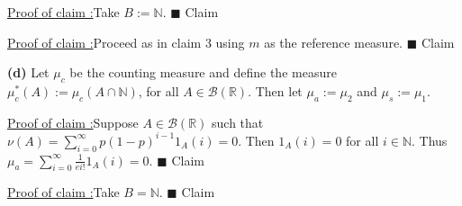 \documentclass[12pt]{article}
\newcounter{ProofCounter}
\newcounter{ClaimCounter}[ProofCounter]
\newenvironment{claim}[1]{\stepcounter{ClaimCounter}\par\noindent\underline{Claim \theClaimCounter:}\space#1}{}
\newenvironment{claimproof}[1]{\par\noindent\underline{Proof of claim \theClaimCounter:}\space#1}{\hfill $\blacksquare$ Claim \theClaimCounter\vspace{5mm}}
\begin{document}
\begin{claimproof}
Take $B := \mathbb{N}$.
\end{claimproof}

\begin{claimproof}
Proceed as in claim 3 using $m$ as the reference measure.
\end{claimproof}



{\bf (d)}
Let $\mu_{c}$ be the counting measure and define the measure $\mu_{c}^*(A) := \mu_{c}(A\cap\mathbb{N})$, for all $A \in \mathcal{B}(\mathbb{R})$. 
Then let $\mu_{a} := \mu_{2}$ and $\mu_{s} := \mu_{1}$.

\begin{claimproof}
Suppose $A \in \mathcal{B}(\mathbb{R})$ such that $\nu(A) = \sum_{i=0}^{\infty}p(1-p)^{i-1}1_{A}(i) = 0$. Then $1_{A}(i) = 0$ for all $i \in
\mathbb{N}$. Thus $\mu_{a} = \sum_{i=0}^{\infty}\frac{1}{ei!}1_{A}(i) = 0$.
\end{claimproof}

\begin{claimproof}
Take $B = \mathbb{N}$.
\end{claimproof}
\end{document}

